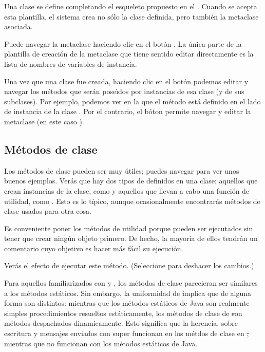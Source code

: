 \documentclass[a4paper,10pt,twoside]{book}
\begin{document}
Una clase se define completando el esqueleto propuesto en el  . 
Cuando se acepta esta plantilla, el sistema crea no s\'olo la clase definida, pero tambi\'en la metaclase asociada.

Puede navegar la metaclase haciendo clic en el bot\'on .
La \'unica parte de la plantilla de creaci\'on de la metaclase que tiene sentido editar directamente es la lista de nombres de variables de instancia.

Una vez que una clase fue creada, haciendo clic en el bot\'on  podemos editar y navegar los m\'etodos  que ser\'an pose\'\i{}dos por instancias de esa clase (y de sus subclases). Por ejemplo, podemos ver en la  que el m\'etodo  est\'a definido en el lado de instancia de la clase  .
Por el contrario, el b\'oton   permite navegar y editar la metaclase (en este caso ).

\subsection{M\'etodos de clase} 

Los m\'etodos de clase pueden ser muy \'utiles; puedes navegar  para ver unos buenos ejemplos.
Ver\'as que hay dos tipos de  definidos en una clase: aquellos que crean instancias de la clase, como  y aquellos que llevan a cabo una funci\'on de utilidad, como . 
Esto es lo t\'ipico, aunque ocasionalmente encontrar\'as m\'etodos de clase usados para otra cosa.  

Es conveniente poner los m\'etodos de utilidad  porque pueden ser ejecutados sin tener que crear ning\'un objeto primero.
De hecho, la mayor\'ia de ellos tendr\'an un comentario cuyo objetivo es hacer m\'as f\'acil su ejecuci\'on.


Ver\'as el efecto de ejecutar este m\'etodo. (Seleccione  para deshacer los cambios.)


Para aquellos familiarizados con  y , los m\'etodos de clase parecieran ser similares a los m\'etodos est\'aticos.
Sin embargo, la uniformidad de \st implica que de alguna forma son distintos: mientras que los m\'etodos est\'aticos de Java son realmente simples procedimientos resueltos est\'aticamente, los m\'etodos de clase de \st son m\'etodos despachados dinamicamente. 
Esto significa que la herencia, sobre-escritura y mensajes enviados con super funcionan en los m\'etdos de clase en \st, mientras que no funcionan con los m\'etodos est\'aticos de Java.
\end{document}
